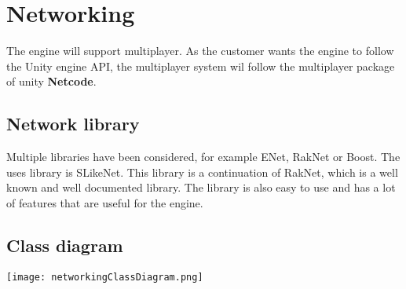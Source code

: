 \section{Networking}
The engine will support multiplayer.
As the customer wants the engine to follow the Unity engine API, the multiplayer system wil follow the multiplayer package of unity \textbf{Netcode}.

\subsection{Network library}
Multiple libraries have been considered, for example ENet, RakNet or Boost.
The uses library is SLikeNet. This library is a continuation of RakNet, which is a well known and well documented library.
The library is also easy to use and has a lot of features that are useful for the engine.

\subsection{Class diagram}
\texttt{[image: networkingClassDiagram.png]}